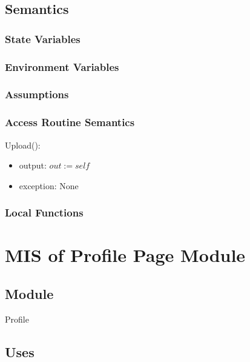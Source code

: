 \documentclass[12pt, titlepage]{article}
\begin{document}
\subsection{Semantics}

\subsubsection{State Variables}



\subsubsection{Environment Variables}



\subsubsection{Assumptions}



\subsubsection{Access Routine Semantics}

\noindent Upload():
\begin{itemize}
	\item output: $out := self$ 
	\item exception: None
\end{itemize}



\subsubsection{Local Functions}


\newpage






\section{MIS of Profile Page Module}



\subsection{Module}

Profile

\subsection{Uses}
\end{document}
